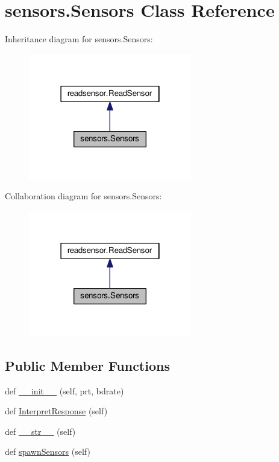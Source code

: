 \hypertarget{classsensors_1_1Sensors}{}\section{sensors.\+Sensors Class Reference}
\label{classsensors_1_1Sensors}


Inheritance diagram for sensors.\+Sensors\+:\nopagebreak
\begin{figure}[H]
\begin{center}
\leavevmode
\includegraphics[width=202pt]{classsensors_1_1Sensors__inherit__graph}
\end{center}
\end{figure}


Collaboration diagram for sensors.\+Sensors\+:\nopagebreak
\begin{figure}[H]
\begin{center}
\leavevmode
\includegraphics[width=202pt]{classsensors_1_1Sensors__coll__graph}
\end{center}
\end{figure}
\subsection*{Public Member Functions}
\begin{DoxyCompactItemize}
\item 
def \hyperlink{classsensors_1_1Sensors_a6f66687dc0058806d12630e3459a4b39}{\+\_\+\+\_\+init\+\_\+\+\_\+} (self, prt, bdrate)
\item 
def \hyperlink{classsensors_1_1Sensors_ae27acc61935425a396ba555e00b9035d}{Interpret\+Response} (self)
\item 
def \hyperlink{classsensors_1_1Sensors_a31172fc78a9e842c470acb6719363e5c}{\+\_\+\+\_\+str\+\_\+\+\_\+} (self)
\item 
def \hyperlink{classsensors_1_1Sensors_ad5dd799765cbc7c3b422381c02b10f9b}{spawn\+Sensors} (self)
\end{DoxyCompactItemize}
